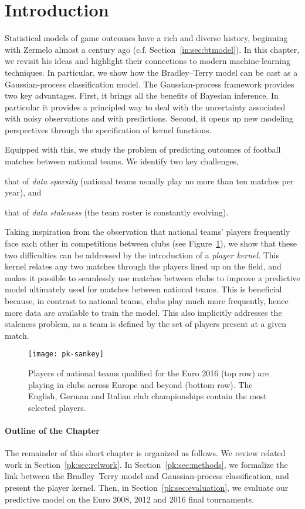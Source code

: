 \section{Introduction}
\label{pk:sec:intro}

Statistical models of game outcomes have a rich and diverse history, beginning with Zermelo almost a century ago (c.f. Section~\ref{in:sec:btmodel}).
In this chapter, we revisit his ideas and highlight their connections to modern machine-learning techniques.
In particular, we show how the Bradley--Terry model can be cast as a Gaussian-process classification model.
The Gaussian-process framework provides two key advantages.
First, it brings all the benefits of Bayesian inference.
In particular it provides a principled way to deal with the uncertainty associated with noisy observations and with predictions.
Second, it opens up new modeling perspectives through the specification of kernel functions.

Equipped with this, we study the problem of predicting outcomes of football matches between national teams.
We identify two key challenges,
\begin{enuminline}
\item that of \emph{data sparsity} (national teams usually play no more than ten matches per year), and
\item that of \emph{data staleness} (the team roster is constantly evolving).
\end{enuminline}
Taking inspiration from the observation that national teams' players frequently face each other in competitions between clubs (see Figure~\ref{pk:fig:sankey}), we show that these two difficulties can be addressed by the introduction of a \emph{player kernel}.
This kernel relates any two matches through the players lined up on the field, and makes it possible to seamlessly use matches between clubs to improve a predictive model ultimately used for matches between national teams.
This is beneficial because, in contrast to national teams, clubs play much more frequently, hence more data are available to train the model.
This also implicitly addresses the staleness problem, as a team is defined by the set of players present at a given match.

\begin{figure}
  \centering
  \texttt{[image: pk-sankey]}
  \caption{
  Players of national teams qualified for the Euro 2016 (top row) are playing in clubs across Europe and beyond (bottom row).
  The English, German and Italian club championships contain the most selected players.
}
  \label{pk:fig:sankey}
\end{figure}

\paragraph{Outline of the Chapter}
The remainder of this short chapter is organized as follows.
We review related work in Section~\ref{pk:sec:relwork}.
In Section~\ref{pk:sec:methods}, we formalize the link between the Bradley--Terry model and Gaussian-process classification, and present the player kernel.
Then, in Section~\ref{pk:sec:evaluation}, we evaluate our predictive model on the Euro 2008, 2012 and 2016 final tournaments.

